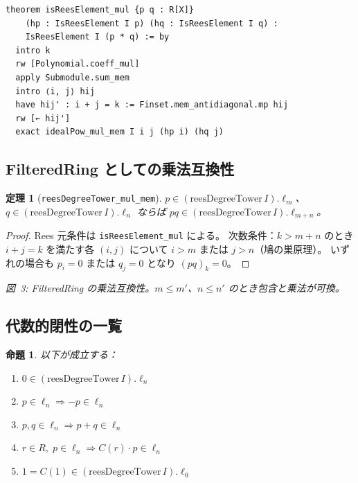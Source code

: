 \documentclass[a4paper,12pt]{article}
\theoremstyle{definition}
\theoremstyle{plain}
\newtheorem{theorem}[definition]{定理}
\newtheorem{proposition}[definition]{命題}
\newcommand{\figcap}[1]{\begin{center}\small\textit{#1}\end{center}}
\newcommand{\reesdeg}{\mathrm{reesDegreeTower}}
\newcommand{\lev}[1]{\ell_{#1}}
\begin{document}
\begin{leanbox}
\begin{lstlisting}
theorem isReesElement_mul {p q : R[X]}
    (hp : IsReesElement I p) (hq : IsReesElement I q) :
    IsReesElement I (p * q) := by
  intro k
  rw [Polynomial.coeff_mul]
  apply Submodule.sum_mem
  intro ⟨i, j⟩ hij
  have hij' : i + j = k := Finset.mem_antidiagonal.mp hij
  rw [← hij']
  exact idealPow_mul_mem I i j (hp i) (hq j)
\end{lstlisting}
\end{leanbox}

\subsection{FilteredRing としての乗法互換性}

\begin{theorem}[\texttt{reesDegreeTower\_mul\_mem}]\label{thm:filteredmul}
$p \in (\reesdeg\,I).\lev{m}$、$q \in (\reesdeg\,I).\lev{n}$ ならば
$pq \in (\reesdeg\,I).\lev{m+n}$。
\end{theorem}
\begin{proof}
Rees 元条件は \texttt{isReesElement\_mul} による。
次数条件：$k > m+n$ のとき $i+j=k$ を満たす各 $(i,j)$ について
$i > m$ または $j > n$（鳩の巣原理）。
いずれの場合も $p_i = 0$ または $q_j = 0$ となり $(pq)_k = 0$。
\end{proof}

\begin{center}
\end{center}
\figcap{図~3: FilteredRing の乗法互換性。$m \leq m'$、$n \leq n'$ のとき包含と乗法が可換。}

\subsection{代数的閉性の一覧}

\begin{proposition}
以下が成立する：
\begin{enumerate}[label=(\arabic*),noitemsep]
  \item $0 \in (\reesdeg\,I).\lev{n}$
  \item $p \in \lev{n} \Rightarrow -p \in \lev{n}$
  \item $p,q \in \lev{n} \Rightarrow p+q \in \lev{n}$
  \item $r \in R,\; p \in \lev{n} \Rightarrow C(r) \cdot p \in \lev{n}$
  \item $1 = C(1) \in (\reesdeg\,I).\lev{0}$
\end{enumerate}
\end{proposition}
\end{document}
